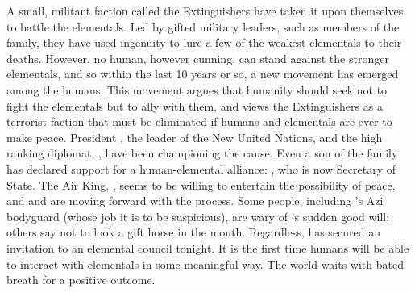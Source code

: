 \documentclass[blue]{elementals}
\begin{document}
A small, militant faction called the Extinguishers have taken it upon themselves to battle the elementals.  Led by gifted military leaders, such as members of the \cDema{\formal} family, they have used ingenuity to lure a few of the weakest elementals to their deaths.  However, no human, however cunning, can stand against the stronger elementals, and so within the last 10 years or so, a new movement has emerged among the humans. This movement argues that humanity should seek not to fight the elementals but to ally with them, and views the Extinguishers as a terrorist faction that must be eliminated if humans and elementals are ever to make peace. President \cLeader{\full}, the leader of the New United Nations, and the high ranking diplomat, \cAvatar{\full}, have been championing the cause. Even a son of the \cDema{\formal} family has declared support for a human-elemental alliance: \cDema{}, who is now Secretary of State.  The Air King, \cKing{}, seems to be willing to entertain the possibility of peace, and \cLeader{} and \cAvatar{} are moving forward with the process. Some people, including \cLeader{}'s Azi bodyguard \cRomeo{\full} (whose job it is to be suspicious), are wary of \cKing{}'s sudden good will; others say not to look a gift horse in the mouth. Regardless, \cLeader{} has secured an invitation to an elemental council tonight. It is the first time humans will be able to interact with elementals in some meaningful way. The world waits with bated breath for a positive outcome.

\end{document}
